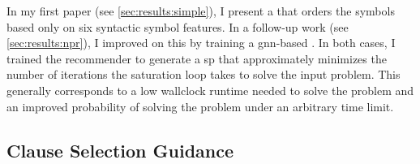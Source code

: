 In my first paper \cite{DBLP:conf/cade/Bartek020} (see \cref{sec:results:simple}),
I present a  that orders the symbols based only on six syntactic symbol features.
In a follow-up work \cite{DBLP:conf/cade/Bartek021} (see \cref{sec:results:npr}),
I improved on this by training a \acrshort{gnn}-based .
In both cases, I trained the recommender to generate a \gls{sp} that
approximately minimizes the number of iterations the saturation loop takes to solve the input problem.
This generally corresponds to
a low \gls{wallclock} \gls{runtime} needed to solve the problem and
an improved probability of solving the problem under an arbitrary time limit.



\subsection{Clause Selection Guidance}
\label{sec:contrib:ClauseSelection}


